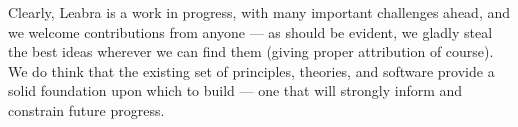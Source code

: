 \documentclass[11pt,twoside]{article}
\begin{document}
Clearly, Leabra is a work in progress, with many important challenges ahead,
and we welcome contributions from anyone --- as should be evident, we gladly
steal the best ideas wherever we can find them (giving proper attribution of
course).  We do think that the existing set of principles, theories, and
software provide a solid foundation upon which to build --- one that will
strongly inform and constrain future progress.




\end{document}
